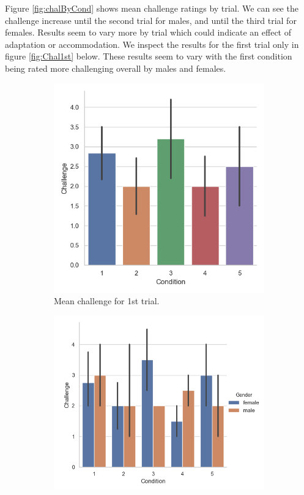 Figure \ref{fig:chalByCond} shows
mean challenge ratings by trial. We can see the challenge increase until the second trial for males, and until the third trial for females. Results seem to vary more by trial which could indicate an effect of adaptation or accommodation. 
We inspect the results for the first trial only in figure \ref{fig:Chal1st} below. These results seem to vary with the first condition being rated more challenging overall by males and females.

\begin{figure}[H]
 \begin{subfigure}[b]{0.5\textwidth}
     \centering
     \includegraphics[scale=0.5]{Files/Plots/challenge_first_trial.png}
     \caption{Mean challenge for 1st trial.}
     \label{fig:meanChal1st}
 \end{subfigure}
  \begin{subfigure}[b]{0.5\textwidth}
     \centering
     \includegraphics[scale=0.5]{Files/Plots/challenge_first_trial_gen.png}

\end{subfigure}
\end{figure}
